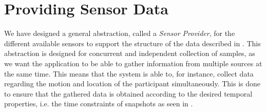 
\section{Providing Sensor Data}
\label{sec:providing_sensor_data}

We have designed a general abstraction, called a \emph{Sensor Provider}, for the different available sensors to support the structure of the data described in . This abstraction is designed for concurrent and independent collection of samples, as we want the application to be able to gather information from multiple sources at the same time. This means that the system is able to, for instance, collect data regarding the motion and location of the participant simultaneously. This is done to ensure that the gathered data is obtained according to the desired temporal properties, i.e. the time constraints of snapshots as seen in .


